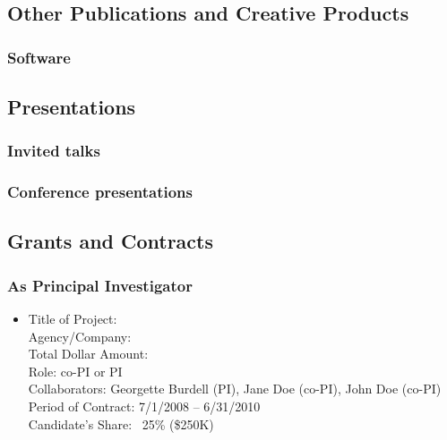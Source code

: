 \begin{adjustwidth}{2em}{0pt}
\subsection{Other Publications and Creative Products}

\subsubsection{Software}

\newrefcontext[labelprefix=S]
\printbibliography[type=software,resetnumbers=true,heading=none]

\subsection{Presentations}

\subsubsection{Invited talks}
\newrefcontext[labelprefix=I]
\printbibliography[resetnumbers=true,filter=invited,heading=none]

\subsubsection{Conference presentations}
\newrefcontext[labelprefix=T]
\printbibliography[resetnumbers=true,filter=talk,heading=none]

\subsection{Grants and Contracts}

\subsubsection{As Principal Investigator}

\begin{itemize}
    \item 
    Title of Project: \\ 
    Agency/Company: \\ 
    Total Dollar Amount:  \\ 
    Role: co-PI or PI \\ 
    Collaborators: Georgette Burdell (PI), Jane Doe (co-PI), John Doe (co-PI) \\ 
    Period of Contract: 7/1/2008 – 6/31/2010 \\ 
    Candidate’s Share: ~25\% (\$250K)
\end{itemize}


\end{adjustwidth}
